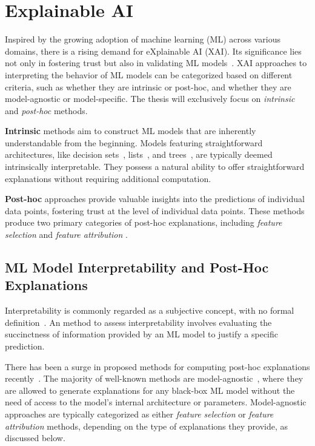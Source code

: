 \section{Explainable AI} \label{sec:xai}

Inspired by the growing adoption of machine learning (ML) across various domains,
there is a rising demand for eXplainable AI (XAI). 
%
Its significance lies not only in fostering trust but also in validating ML
models~\cite{guidotti-acmcs19,swm-arxiv17}.
%
XAI approaches to interpreting the behavior of ML models can be categorized 
based on different criteria, such as whether they are intrinsic or post-hoc, 
and whether they are model-agnostic or model-specific. 
%
The thesis will exclusively focus on \emph{intrinsic} and \emph{post-hoc} methods.

\textbf{Intrinsic} methods aim to construct ML models that are inherently
understandable from the beginning.
%
Models featuring straightforward architectures, like decision sets~\cite{leskovec-kdd16},
lists~\cite{rudin-mpc18}, and trees~\cite{rivest-ipl76}, are typically deemed intrinsically 
interpretable.
%
They possess a natural ability to offer straightforward explanations without 
requiring additional computation.

\textbf{Post-hoc} approaches provide valuable insights into the predictions of 
individual data points, fostering trust at the level of individual data points.
%
These methods produce two primary categories of post-hoc explanations,
including \emph{feature selection} and \emph{feature attribution} .

\subsection{ML Model Interpretability and Post-Hoc Explanations}\label{sec:posexpl}


Interpretability is commonly regarded as a subjective concept, 
with no formal definition~\cite{lipton-cacm18}.
%
An method to assess interpretability involves evaluating the succinctness of information 
provided by an ML model to justify a specific prediction.

There has been a surge in proposed methods for computing post-hoc 
explanations recently~\cite{miller2019explanation,molnar-bk20}. 
%
The majority of well-known methods are model-agnostic~\cite{guestrin-kdd16,lundberg-nips17,guestrin-aaai18}, 
where they are allowed to generate explanations for any black-box ML model without 
the need of access to the model's internal architecture or parameters.
%
Model-agnostic approaches are typically categorized as either \emph{feature selection} or
\emph{feature attribution} methods, depending on the type of explanations they provide, as discussed below.

